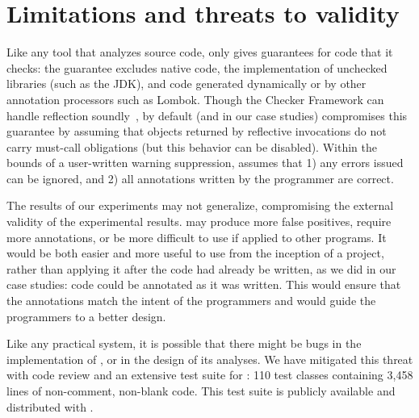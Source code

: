 \section{Limitations and threats to validity}
\label{sec:threats}

Like any tool that analyzes source code, \Tool only
gives guarantees for code that it checks: the guarantee
excludes native code, the implementation of unchecked libraries (such as the JDK),
and code generated dynamically or by other annotation processors
such as Lombok.
Though
the Checker Framework can handle 
reflection soundly~\cite{BarrosJMVDdAE2015}, by default (and in our case studies)
\Tool compromises this guarantee
by assuming that objects returned by reflective invocations
do not carry must-call obligations (but this behavior can
be disabled).
Within the bounds
of a user-written warning suppression, \Tool assumes that 1)
any errors issued can be ignored, and 2) all annotations
written by the programmer are correct.

The results of our experiments may not generalize, compromising the
external validity of the experimental results.
\Tool may produce more false positives, require
more annotations, or be more difficult to use if applied to other
programs.  It would be both easier and more useful to use \Tool from
the inception of a project, rather than applying it after the code had
already be written, as we did in our case studies: code could be
annotated as it was written.  This would ensure that the annotations match
the intent of the programmers and would guide the programmers to a better design.

Like any practical system, it is possible that there might
be bugs in the implementation of \Tool, or in the design of
its analyses. We have mitigated this threat with code review and an extensive
test suite for \Tool:
110 test classes containing 3,458 lines of non-comment, non-blank code.
This test suite is publicly available and distributed with \Tool.
